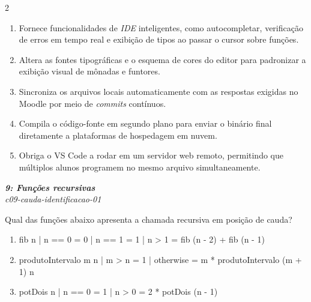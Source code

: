 \documentclass[a4paper,10pt,brazil]{article}
\begin{document}
\begin{multicols}{2}
\begin{enumerate}
  \item Fornece funcionalidades de \emph{IDE} inteligentes, como autocompletar, verificação de erros em tempo real e exibição de tipos ao passar o cursor sobre funções.

  \item Altera as fontes tipográficas e o esquema de cores do editor para padronizar a exibição visual de mônadas e funtores.

  \item Sincroniza os arquivos locais automaticamente com as respostas exigidas no Moodle por meio de \emph{commits} contínuos.

  \item Compila o código-fonte em segundo plano para enviar o binário final diretamente a plataformas de hospedagem em nuvem.

  \item Obriga o VS Code a rodar em um servidor web remoto, permitindo que múltiplos alunos programem no mesmo arquivo simultaneamente.


\end{enumerate}

\begin{flushright}
  \footnotesize
  \textit{\textbf{9: Funções recursivas}}\\
  \textit{c09-cauda-identificacao-01}\\

\end{flushright}
Qual das funções abaixo apresenta a chamada recursiva em posição de cauda?

\begin{enumerate}
  \item \begin{haskellcode}
fib n
  | n == 0 = 0
  | n == 1 = 1
  | n > 1  = fib (n - 2) + fib (n - 1)
\end{haskellcode}

  \item \begin{haskellcode}
produtoIntervalo m n
  | m > n     = 1
  | otherwise = m * produtoIntervalo (m + 1) n
\end{haskellcode}

  \item \begin{haskellcode}
potDois n
  | n == 0 = 1
  | n > 0  = 2 * potDois (n - 1)
\end{haskellcode}


\end{enumerate}
\end{multicols}
\end{document}
